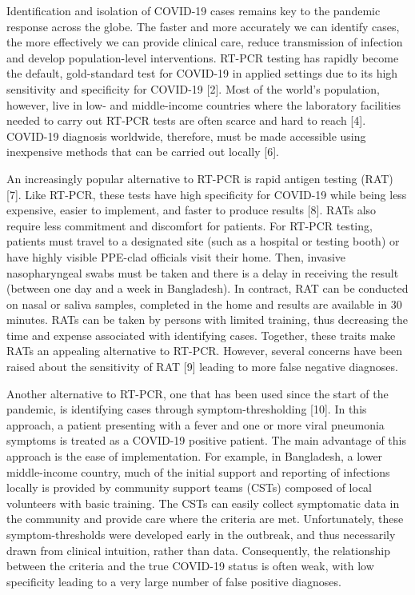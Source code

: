 \documentclass[]{elsarticle} %
\begin{document}
Identification and isolation of COVID-19 cases remains key to the
pandemic response across the globe. The faster and more accurately we
can identify cases, the more effectively we can provide clinical care,
reduce transmission of infection and develop population-level
interventions. RT-PCR testing has rapidly become the default,
gold-standard test for COVID-19 in applied settings due to its high
sensitivity and specificity for COVID-19 {[}2{]}. Most of the world's
population, however, live in low- and middle-income countries where the
laboratory facilities needed to carry out RT-PCR tests are often scarce
and hard to reach {[}4{]}. COVID-19 diagnosis worldwide, therefore, must
be made accessible using inexpensive methods that can be carried out
locally {[}6{]}.

An increasingly popular alternative to RT-PCR is rapid antigen testing
(RAT) {[}7{]}. Like RT-PCR, these tests have high specificity for
COVID-19 while being less expensive, easier to implement, and faster to
produce results {[}8{]}. RATs also require less commitment and
discomfort for patients. For RT-PCR testing, patients must travel to a
designated site (such as a hospital or testing booth) or have highly
visible PPE-clad officials visit their home. Then, invasive
nasopharyngeal swabs must be taken and there is a delay in receiving the
result (between one day and a week in Bangladesh). In contract, RAT can
be conducted on nasal or saliva samples, completed in the home and
results are available in 30 minutes. RATs can be taken by persons with
limited training, thus decreasing the time and expense associated with
identifying cases. Together, these traits make RATs an appealing
alternative to RT-PCR. However, several concerns have been raised about
the sensitivity of RAT {[}9{]} leading to more false negative diagnoses.

Another alternative to RT-PCR, one that has been used since the start of
the pandemic, is identifying cases through symptom-thresholding
{[}10{]}. In this approach, a patient presenting with a fever and one or
more viral pneumonia symptoms is treated as a COVID-19 positive patient.
The main advantage of this approach is the ease of implementation. For
example, in Bangladesh, a lower middle-income country, much of the
initial support and reporting of infections locally is provided by
community support teams (CSTs) composed of local volunteers with basic
training. The CSTs can easily collect symptomatic data in the community
and provide care where the criteria are met. Unfortunately, these
symptom-thresholds were developed early in the outbreak, and thus
necessarily drawn from clinical intuition, rather than data.
Consequently, the relationship between the criteria and the true
COVID-19 status is often weak, with low specificity leading to a very
large number of false positive diagnoses.
\end{document}
